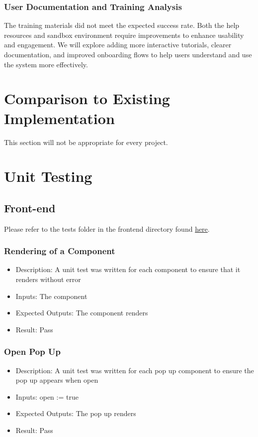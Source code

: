 \documentclass[12pt, titlepage]{article}
\begin{document}
\subsubsection{User Documentation and Training Analysis}
The training materials did not meet the expected success rate. Both the help resources and sandbox environment require improvements to enhance usability and engagement. We will explore adding more interactive tutorials, clearer documentation, and improved onboarding flows to help users understand and use the system more effectively.


	
\section{Comparison to Existing Implementation}	

This section will not be appropriate for every project.

\section{Unit Testing}
\subsection{Front-end}
Please refer to the tests folder in the frontend directory found \href{https://github.com/OKKM-insights/frontend/tree/main/tests/__tests__}{here}.
\subsubsection{Rendering of a Component}
\begin{itemize}
    \item Description: A unit test was written for each component to ensure that it renders without error
    \item Inputs: The component
    \item Expected Outputs: The component renders 
    \item Result: Pass
\end{itemize}
\subsubsection{Open Pop Up}
\begin{itemize}
    \item Description: A unit test was written for each pop up component to ensure the pop up appears when open
    \item Inputs: open := true
    \item Expected Outputs: The pop up renders 
    \item Result: Pass
\end{itemize}
\end{document}
